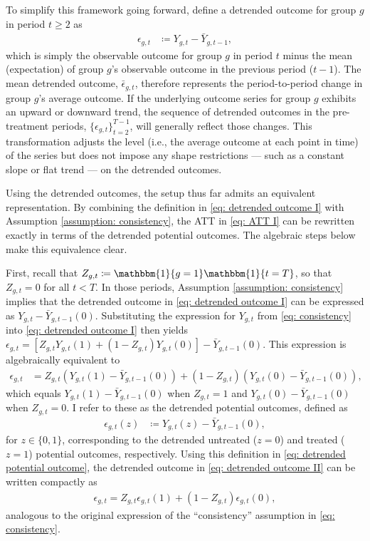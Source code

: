 \documentclass[twoside,11pt]{article}
\begin{document}
To simplify this framework going forward, define a detrended outcome for group $g$ in period $t \geq 2$ as
\begin{align} \label{eq: detrended outcome I}
\epsilon_{g,t} & \coloneqq Y_{g,t} - \bar{Y}_{g,t-1},
\end{align}
which is simply the observable outcome for group $g$ in period $t$ minus the mean (expectation) of group $g$'s observable outcome in the previous period ($t - 1$). The mean detrended outcome, $\bar{\epsilon}_{g,t}$, therefore represents the period-to-period change in group $g$'s average outcome. If the underlying outcome series for group $g$ exhibits an upward or downward trend, the sequence of detrended outcomes in the pre-treatment periods, $ \{\epsilon_{g,t}\}_{t=2}^{T-1}$, will generally reflect those changes. This transformation adjusts the level (i.e., the average outcome at each point in time) of the series but does not impose any shape restrictions --- such as a constant slope or flat trend --- on the detrended outcomes.

Using the detrended outcomes, the setup thus far admits an equivalent representation. By combining the definition in \eqref{eq: detrended outcome I} with Assumption \ref{assumption: consistency}, the ATT in \eqref{eq: ATT I} can be rewritten exactly in terms of the detrended potential outcomes. The algebraic steps below make this equivalence clear.

First, recall that $Z_{g,t} \coloneqq \mathbbm{1}\{g = 1\} \mathbbm{1}\{t = T\}$, so that $Z_{g,t} = 0$ for all $t < T$. In those periods, Assumption \ref{assumption: consistency} implies that the detrended outcome in \eqref{eq: detrended outcome I} can be expressed as $Y_{g,t} - \bar{Y}_{g,t-1}(0)$. Substituting the expression for $Y_{g,t}$ from \eqref{eq: consistency} into \eqref{eq: detrended outcome I} then yields $\epsilon_{g,t} = \left[Z_{g,t} Y_{g,t}(1) + \left(1 - Z_{g,t}\right)Y_{g,t}(0)\right] - \bar{Y}_{g,t-1}(0)$. This expression is algebraically equivalent to 
\begin{align} \label{eq: detrended outcome II}
\epsilon_{g,t} & = Z_{g,t} \left(Y_{g,t}(1) - \bar{Y}_{g,t-1}(0)\right) + \left(1 - Z_{g,t}\right)\left(Y_{g,t}(0) - \bar{Y}_{g,t-1}(0)\right),
\end{align}
which equals $Y_{g,t}(1) - \bar{Y}_{g,t-1}(0)$ when $Z_{g,t} = 1$ and $Y_{g,t}(0) - \bar{Y}_{g,t-1}(0)$ when $Z_{g,t} = 0$. I refer to these as the detrended potential outcomes, defined as
\begin{align} \label{eq: detrended potential outcome}
\epsilon_{g,t}(z) & \coloneqq Y_{g,t}(z) - \bar{Y}_{g,t-1}(0),
\end{align}
for $z \in \{0, 1\}$, corresponding to the detrended untreated ($z = 0$) and treated ($z = 1$) potential outcomes, respectively. Using this definition in \eqref{eq: detrended potential outcome}, the detrended outcome in \eqref{eq: detrended outcome II} can be written compactly as 
\begin{align} \label{eq: detrended outcome III}
\epsilon_{g,t} = Z_{g,t} \epsilon_{g,t}(1) + (1 - Z_{g,t})\epsilon_{g,t}(0),
\end{align}
analogous to the original expression of the ``consistency'' assumption in \eqref{eq: consistency}.
\end{document}
